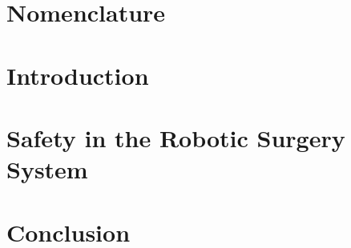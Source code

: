 
\graphicspath{{figures/}}


	






\setcounter{page}{1}
\renewcommand{\thepage}{\Roman{page}}




\setlength\parskip{0ex}
\tableofcontents
\setlength\parskip{1ex}

\chapter*{Nomenclature}\label{chap:acronym}
\printglossary[style=mcoltree,title=Glossary] %
\printglossary[type=\acronymtype,style=glossary2col] %
\printglossary[type=symbols,style=altlong4col] %
\clearpage



\cleardoublepage
\setcounter{page}{1}
\renewcommand{\thepage}{\arabic{page}}

\chapter{Introduction}\label{chap:intro}



\chapter{Safety in the Robotic Surgery System}



\chapter{Conclusion}\label{chap:conclusion}



\begingroup
\raggedright
\clearpage
{}

\endgroup
\label{sourceliste}

\newpage

